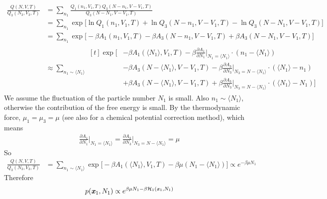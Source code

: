 \documentclass[aps,pre,preprint]{revtex4}
\renewcommand{\v}[1]{\textbf{\textit{#1}}}
\begin{document}
\begin{align}\nonumber
  \frac{Q(N,V,T)}{Q_3(N_3,V_3,T)}
  &=
  \sum_{n_1}
  \frac{Q_1(n_1,V_1,T)Q_3(N - n_1,V - V_1,T)}{Q_3(N - N_1,V - V_1,T)}\\ \nonumber
  &=
  \sum_{n_1}
  \exp\bigg[
  \ln Q_1(n_1,V_1,T) + \ln Q_3(N - n_1,V - V_1,T) -
  \ln Q_3(N - N_1,V - V_1,T)
  \bigg] \\\nonumber
  &=
  \sum_{n_1}
  \exp\bigg[
  -\beta A_1(n_1,V_1,T) 
  -\beta A_3(N - n_1,V - V_1,T)
  +\beta A_3(N - N_1,V - V_1,T)  
  \bigg] \\\nonumber
  &\approx
  \sum_{n_1\sim \langle N_1\rangle}
  \begin{aligned}[t]
    \exp\bigg[
    &
    -\beta A_1(\langle N_1\rangle,V_1,T) 
    -\beta \frac{\partial A_1}{\partial N_1}\bigg\vert_{N_1=\langle N_1\rangle}
    \cdot(n_1 - \langle N_1\rangle) \\
    &
    -\beta A_3(N - \langle N_1\rangle,V - V_1,T)
    -\beta \frac{\partial A_3}{\partial N_3}\bigg\vert_{N_3 = N-\langle N_1\rangle}
    \cdot(\langle N_1\rangle - n_1) \\    
    &
    +\beta A_3(N - \langle N_1\rangle,V - V_1,T)
    +\beta \frac{\partial A_3}{\partial N_3}\bigg\vert_{N_3 = N-\langle N_1\rangle}
    \cdot(\langle N_1\rangle - N_1) 
    \bigg]
  \end{aligned}
\end{align}
We assume the fluctuation of the particle number $N_1$ is small. Also
$n_1\sim \langle N_1\rangle$, otherwise the contribution of the free
energy is small.  By the thermodynamic force, $\mu_1 = \mu_3 = \mu$
(see also \cite{poblete2010coupling} for a chemical potential
correction method), which means
\begin{align}
  \frac{\partial A_1}{\partial N_1}\bigg\vert_{N_1=\langle N_1\rangle}
  =
  \frac{\partial A_3}{\partial N_3}\bigg\vert_{N_3= N-\langle N_1\rangle}
  = \mu
\end{align}
So
\begin{align}\nonumber
  \frac{Q(N,V,T)}{Q_3(N_3,V_3,T)}
  &=
  \sum_{n_1\sim \langle N_1\rangle}
  \exp\big[
  -\beta A_1(\langle N_1\rangle,V_1,T) 
  -\beta\mu(N_1 - \langle N_1\rangle)
  \big]
  \propto
  e^{-\beta\mu N_1}
\end{align}
Therefore
\begin{align}
  p(\v x_1, N_1) \propto e^{\beta\mu N_1 -\beta\mathcal H_1(\v x_1, N_1)}
\end{align}


{}

\end{document}

